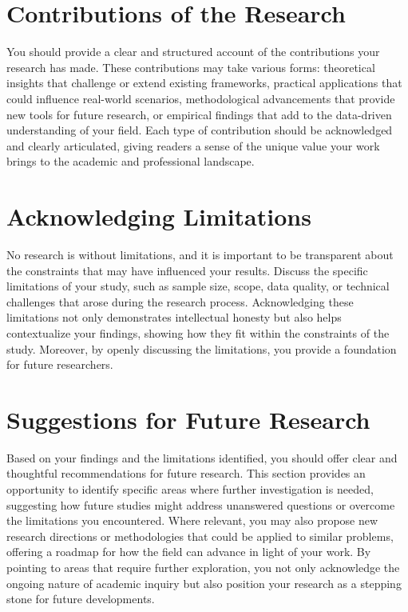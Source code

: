 \documentclass{iutbscthesis}
\begin{document}
\section{Contributions of the Research}

You should provide a clear and structured account of the contributions your research has made. These contributions may take various forms: theoretical insights that challenge or extend existing frameworks, practical applications that could influence real-world scenarios, methodological advancements that provide new tools for future research, or empirical findings that add to the data-driven understanding of your field. Each type of contribution should be acknowledged and clearly articulated, giving readers a sense of the unique value your work brings to the academic and professional landscape.

\section{Acknowledging Limitations}

No research is without limitations, and it is important to be transparent about the constraints that may have influenced your results. Discuss the specific limitations of your study, such as sample size, scope, data quality, or technical challenges that arose during the research process. Acknowledging these limitations not only demonstrates intellectual honesty but also helps contextualize your findings, showing how they fit within the constraints of the study. Moreover, by openly discussing the limitations, you provide a foundation for future researchers.

\section{Suggestions for Future Research}

Based on your findings and the limitations identified, you should offer clear and thoughtful recommendations for future research. This section provides an opportunity to identify specific areas where further investigation is needed, suggesting how future studies might address unanswered questions or overcome the limitations you encountered. Where relevant, you may also propose new research directions or methodologies that could be applied to similar problems, offering a roadmap for how the field can advance in light of your work. By pointing to areas that require further exploration, you not only acknowledge the ongoing nature of academic inquiry but also position your research as a stepping stone for future developments.
\end{document}
